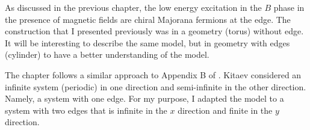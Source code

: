 \label{ch:3}

As discussed in the previous chapter, the low energy excitation in the $B$ phase in the presence of magnetic fields are chiral Majorana fermions at the edge. The construction that I presented previously was in a geometry (torus) without edge. It will be interesting to describe the same model, but in  geometry with edges (cylinder) to have a better understanding of the model.


The chapter follows a similar approach to Appendix B of \cite{Kitaev_2006}. Kitaev considered an infinite system (periodic) in one direction and semi-infinite in the other direction. Namely, a system with one edge. For my purpose, I adapted the model to a system with two edges that is infinite in the $x$ direction and finite in the $y$ direction. 


